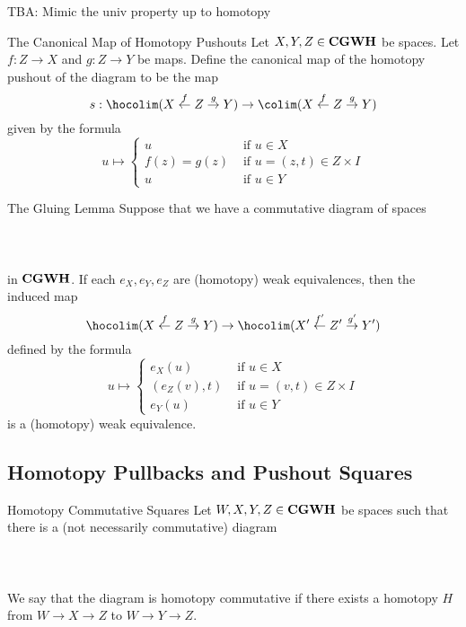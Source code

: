 \documentclass[a4paper]{article}
\begin{document}
TBA: Mimic the univ property up to homotopy

\begin{defn}{The Canonical Map of Homotopy Pushouts}{} Let $X,Y,Z\in\bold{CGWH}$ be spaces. Let $f:Z\to X$ and $g:Z\to Y$ be maps. Define the canonical map of the homotopy pushout of the diagram to be the map $$s:\hocolim(X\overset{f}{\leftarrow}Z\overset{g}{\rightarrow}Y)\to\colim(X\overset{f}{\leftarrow}Z\overset{g}{\rightarrow}Y)$$ given by the formula $$u\mapsto\begin{cases}
u & \text{ if }u\in X\\
f(z)=g(z) & \text{ if }u=(z,t)\in Z\times I\\
u & \text{ if }u\in Y
\end{cases}$$
\end{defn}

\begin{thm}{The Gluing Lemma}{} Suppose that we have a commutative diagram of spaces \\~\\
\\~\\
in $\bold{CGWH}$. If each $e_X,e_Y,e_Z$ are (homotopy) weak equivalences, then the induced map $$\hocolim(X\overset{f}{\leftarrow}Z\overset{g}{\rightarrow}Y)\to\hocolim(X'\overset{f'}{\leftarrow}Z'\overset{g'}{\rightarrow}Y')$$ defined by the formula $$u\mapsto\begin{cases}
e_X(u) & \text{ if }u\in X\\
(e_Z(v),t) & \text{ if }u=(v,t)\in Z\times I\\
e_Y(u) & \text{ if }u\in Y
\end{cases}$$ is a (homotopy) weak equivalence. 
\end{thm}

\subsection{Homotopy Pullbacks and Pushout Squares}
\begin{defn}{Homotopy Commutative Squares}{} Let $W,X,Y,Z\in\bold{CGWH}$ be spaces such that there is a (not necessarily commutative) diagram \\~\\
\\~\\
We say that the diagram is homotopy commutative if there exists a homotopy $H$ from $W\to X\to Z$ to $W\to Y\to Z$. 
\end{defn}
\end{document}
